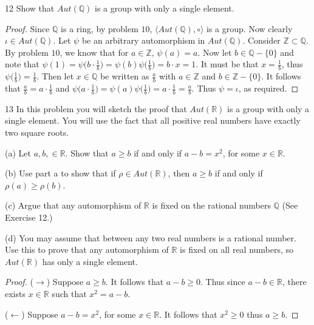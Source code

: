 \begin{problem}{12}
    Show that $Aut(\mathbb{Q})$ is a group with only 
    a single element.
\end{problem}
\solved

\begin{proof} 
    Since $\mathbb{Q}$ is a ring, by problem $10$, $\langle Aut(\mathbb{Q}), \circ \rangle$ is a group. 
    Now clearly $\iota \in Aut(\mathbb{Q})$. 
    Let $\psi$ be an arbitrary automorphism in $Aut(\mathbb{Q})$. 
    Consider $\mathbb{Z} \subset \mathbb{Q}$. By problem $10$, we know that for $a \in \mathbb{Z}$, $\psi(a) = a$. 
    Now let $b \in \mathbb{Q} - \{0\}$ and note that 
    $
    \psi(1) = \psi\Big(b \cdot \frac{1}{b}\Big) = \psi(b) \psi\Big(\frac{1}{b}\Big) = b \cdot x = 1
    $.
    It must be that $x = \frac{1}{b}$, thus $\psi\Big(\frac{1}{b}\Big) = \frac{1}{b}$. 
    Then let $x \in \mathbb{Q}$ be written as $\frac{a}{b}$ with $a \in \mathbb{Z}$ and $b \in \mathbb{Z} - \{0\}$. 
    It follows that $\frac{a}{b} = a \cdot \frac{1}{b}$ and 
    $
    \psi\Big(a \cdot \frac{1}{b}\Big) = \psi(a) \psi\Big(\frac{1}{b}\Big) = a \cdot \frac{1}{b} = \frac{a}{b}
    $.
    Thus $\psi = \iota$, as required. 
\end{proof}

\begin{problem}{13}
    In this problem you will sketch the proof that $Aut(\mathbb{R})$ is a group 
    with only a single element. You will use the fact that all 
    positive real numbers have exactly two square roots.

    (a) Let $a, b, \in \mathbb{R}$. Show that $a \ge b$ if and only if 
    $a - b = x^2$, for some $x \in \mathbb{R}$.

    (b) Use part a to show that if $\rho \in Aut(\mathbb{R})$, then $a \ge b$
    if and only if $\rho(a) \ge \rho(b)$.

    (c) Argue that any automorphism of $\mathbb{R}$ is fixed on the rational 
    numbers $\mathbb{Q}$ (See Exercise 12.)

    (d) You may assume that between any two real numbers is a rational number.
    Use this to prove that any automorphism of $\mathbb{R}$ is fixed on all 
    real numbers, so $Aut(\mathbb{R})$ has only a single element.
\end{problem}
\solved

\begin{proof}
($\longrightarrow$) 
    Suppose $a \ge b$.
    It follows that $a - b \ge 0$.
    Thus since $a - b \in \mathbb{R}$,
    there exists $x \in \mathbb{R}$
    such that $x^2 = a - b$.

    ($\longleftarrow$)
    Suppose $a - b = x^2$, for some $x \in \mathbb{R}$.
    It follows that $x^2 \ge 0$ thus $a \ge b$.
\end{proof}

